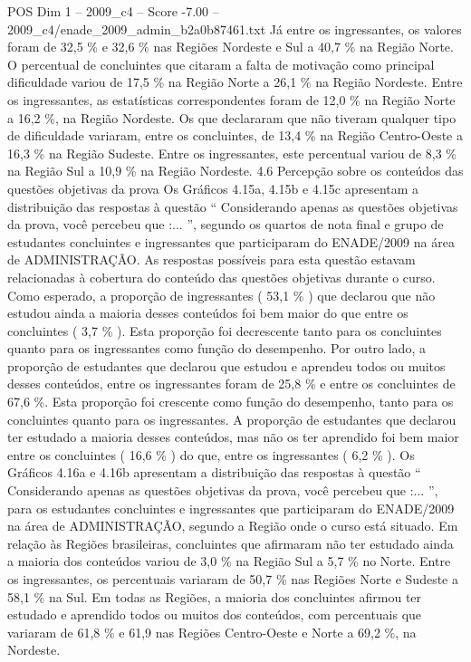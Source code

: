 \begin{textsample}{POS Dim 1 – 2009\_c4 – Score -7.00 – 2009\_c4/enade\_2009\_admin\_b2a0b87461.txt}
Já entre os ingressantes, os valores foram de 32,5 \% e 32,6 \% nas Regiões Nordeste e Sul a 40,7 \% na Região Norte.
O percentual de concluintes que citaram a falta de motivação como principal dificuldade variou de 17,5 \% na Região Norte a 26,1 \% na Região Nordeste.
Entre os ingressantes, as estatísticas correspondentes foram de 12,0 \% na Região Norte a 16,2 \%, na Região Nordeste.
Os que declararam que não tiveram qualquer tipo de dificuldade variaram, entre os concluintes, de 13,4 \% na Região Centro-Oeste a 16,3 \% na Região Sudeste.
Entre os ingressantes, este percentual variou de 8,3 \% na Região Sul a 10,9 \% na Região Nordeste. 4.6 Percepção sobre os conteúdos das questões objetivas da prova Os Gráficos 4.15a, 4.15b e 4.15c apresentam a distribuição das respostas à questão “ Considerando apenas as questões objetivas da prova, você percebeu que :... ”, segundo os quartos de nota final e grupo de estudantes concluintes e ingressantes que participaram do ENADE/2009 na área de ADMINISTRAÇÃO.
As respostas possíveis para esta questão estavam relacionadas à cobertura do conteúdo das questões objetivas durante o curso.
Como esperado, a proporção de ingressantes ( 53,1 \% ) que declarou que não estudou ainda a maioria desses conteúdos foi bem maior do que entre os concluintes ( 3,7 \% ).
Esta proporção foi decrescente tanto para os concluintes quanto para os ingressantes como função do desempenho.
Por outro lado, a proporção de estudantes que declarou que estudou e aprendeu todos ou muitos desses conteúdos, entre os ingressantes foram de 25,8 \% e entre os concluintes de 67,6 \%.
Esta proporção foi crescente como função do desempenho, tanto para os concluintes quanto para os ingressantes.
A proporção de estudantes que declarou ter estudado a maioria desses conteúdos, mas não os ter aprendido foi bem maior entre os concluintes ( 16,6 \% ) do que, entre os ingressantes ( 6,2 \% ).
Os Gráficos 4.16a e 4.16b apresentam a distribuição das respostas à questão “ Considerando apenas as questões objetivas da prova, você percebeu que :... ”, para os estudantes concluintes e ingressantes que participaram do ENADE/2009 na área de ADMINISTRAÇÃO, segundo a Região onde o curso está situado.
Em relação às Regiões brasileiras, concluintes que afirmaram não ter estudado ainda a maioria dos conteúdos variou de 3,0 \% na Região Sul a 5,7 \% no Norte.
Entre os ingressantes, os percentuais variaram de 50,7 \% nas Regiões Norte e Sudeste a 58,1 \% na Sul.
Em todas as Regiões, a maioria dos concluintes afirmou ter estudado e aprendido todos ou muitos dos conteúdos, com percentuais que variaram de 61,8 \% e 61,9 nas Regiões Centro-Oeste e Norte a 69,2 \%, na Nordeste.

\end{textsample}
